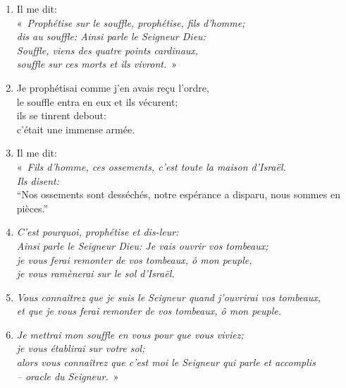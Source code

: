 \documentclass[12pt,a4paper,titlepage]{article}
\def \pslabelsep{0.2em} %
\def \psleftmargin{0em} %
\begin{document}
\begin{enumerate}[leftmargin=\psleftmargin, labelsep = \pslabelsep, label={\arabic*}, font=\color{\pscolor}\small\textsuperscript, parsep=0em, itemsep=0em, topsep=0em ]
\item Il me dit: \\ \decalage «~\textit{Prophétise sur le souffle, prophétise, fils d’homme; \\ \decalage dis au souffle: Ainsi parle le Seigneur Dieu: \\ \decalage Souffle, viens des quatre points cardinaux, \\ \decalage souffle sur ces morts et ils vivront.}~»
\item Je prophétisai comme j’en avais reçu l’ordre, \\ le souffle entra en eux et ils vécurent; \\ ils se tinrent debout: \\ c’était une immense armée.\verseSpace
\item Il me dit: \\ \decalage «~\textit{Fils d’homme, ces ossements, c’est toute la maison d’Israël. \\ \decalage Ils disent:} \\ \decalage \decalage  “Nos ossements sont desséchés, notre espérance a disparu, nous sommes en pièces.”
\item \decalage \textit{C’est pourquoi, prophétise et dis-leur: \\ \decalage Ainsi parle le Seigneur Dieu: Je vais ouvrir vos tombeaux; \\ \decalage je vous ferai remonter de vos tombeaux, ô mon peuple, \\ \decalage je vous ramènerai sur le sol d’Israël.}
\item \decalage \textit{Vous connaîtrez que je suis le Seigneur quand j’ouvrirai vos tombeaux, \\ \decalage et que je vous ferai remonter de vos tombeaux, ô mon peuple.}
\item \decalage \textit{Je mettrai mon souffle en vous pour que vous viviez; \\ \decalage je vous établirai sur votre sol; \\ \decalage alors vous connaîtrez que c’est moi le Seigneur qui parle et accomplis \\ \decalage – oracle du Seigneur.}~»\parSpace

\end{enumerate}
\end{document}
